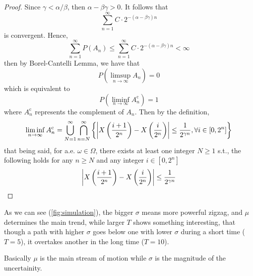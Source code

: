 \documentclass{homework}
\begin{document}
\begin{subproblem}
        \item
        \begin{proof}
            Since $\gamma<\alpha/\beta$, then $\alpha-\beta\gamma>0$.
            It follows that
            \[\sum_{n=1}^\infty C\cdot 2^{-(\alpha-\beta\gamma)n}\]
            is convergent. Hence,
            \[\sum_{n=1}^\infty P(A_n)
            \leq\sum_{n=1}^\infty C\cdot 2^{-(\alpha-\beta\gamma)n}
            <\infty\]
            then by Borel-Cantelli Lemma, we have that
            \[P\left(\limsup_{n\to\infty}A_n\right)=0\]
            which is equivalent to
            \[P\left(\liminf_{n\to\infty}A_n^\mathrm c\right)=1\]
            where $A_n^\mathrm c$ represents the complement of $A_n$.
            Then by the definition,
            \[\liminf_{n\to\infty}A_n^\mathrm c
            =\bigcup_{N=1}^\infty\bigcap_{n=N}^\infty
            \left\{\left|X\left(\frac{i+1}{2^n}\right)-X\left(\frac{i}{2^n}\right)\right|\leq\frac{1}{2^{\gamma n}}
            ,\forall i\in[0,2^n]\right\}\]
            that being said, for a.e. $\omega\in\Omega$,
            there exists at least one integer $N\geq 1$ s.t.,
            the following holds for any $n\geq N$ and any integer
            $i\in [0,2^n]$
            \[\left|X\left(\frac{i+1}{2^n}\right)-X\left(\frac{i}{2^n}\right)\right|\leq\frac{1}{2^{\gamma n}}\]
        \end{proof}
    \end{subproblem}

    \problem
    As we can see (\cref{fig:simulation}), the bigger $\sigma$ means more
    powerful zigzag, and $\mu$ determines the main trend,
    while larger $T$ shows something interesting, that though
    a path with higher $\sigma$ goes below one with lower
    $\sigma$ during a short time ($T=5$),
    it overtakes another in the long time ($T=10$).

    Basically $\mu$ is the main stream of motion while
    $\sigma$ is the magnitude of the uncertainity.
\end{document}
